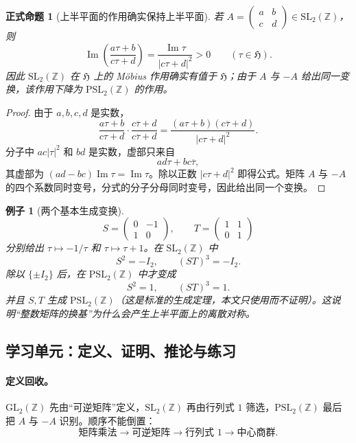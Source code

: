 \documentclass[UTF8,fontset=none,a4paper,11pt]{ctexart}
\theoremstyle{foundation-definition}
\theoremstyle{foundation-theorem}
\theoremstyle{foundation-proposition}
\newtheorem{proposition}[definition]{正式命题}
\theoremstyle{foundation-example}
\newtheorem{example}[definition]{例子}
\theoremstyle{foundation-remark}
\theoremstyle{foundation-theorem}
\begin{document}
\clearpage
\begin{proposition}[上半平面的作用确实保持上半平面]\label{prop:psl-action}
若 \(A=\begin{pmatrix}a&b\\c&d\end{pmatrix}\in\mathrm{SL}_2(\mathbb Z)\)，则
\[
\operatorname{Im}\left(\frac{a\tau+b}{c\tau+d}\right)
=\frac{\operatorname{Im}\tau}{|c\tau+d|^2}>0
\qquad(\tau\in\mathfrak H).
\]
因此 \(\mathrm{SL}_2(\mathbb Z)\) 在 \(\mathfrak H\) 上的 Möbius 作用确实有值于 \(\mathfrak H\)；由于 \(A\) 与 \(-A\) 给出同一变换，该作用下降为 \(\mathrm{PSL}_2(\mathbb Z)\) 的作用。
\end{proposition}

\begin{proof}
由于 \(a,b,c,d\) 是实数，
\[
\frac{a\tau+b}{c\tau+d}
\cdot\frac{c\overline\tau+d}{c\overline\tau+d}
=\frac{(a\tau+b)(c\overline\tau+d)}{|c\tau+d|^2}.
\]
分子中 \(ac|\tau|^2\) 和 \(bd\) 是实数，虚部只来自
\[
ad\tau+bc\overline\tau,
\]
其虚部为 \((ad-bc)\operatorname{Im}\tau=\operatorname{Im}\tau\)。除以正数 \(|c\tau+d|^2\) 即得公式。矩阵 \(A\) 与 \(-A\) 的四个系数同时变号，分式的分子分母同时变号，因此给出同一个变换。
\end{proof}

\begin{example}[两个基本生成变换]
\[
S=\begin{pmatrix}0&-1\\1&0\end{pmatrix},
\qquad
T=\begin{pmatrix}1&1\\0&1\end{pmatrix}
\]
分别给出 \(\tau\mapsto-1/\tau\) 和 \(\tau\mapsto\tau+1\)。在
\(\mathrm{SL}_2(\mathbb Z)\) 中
\[
S^2=-I_2,\qquad (ST)^3=-I_2.
\]
除以 \(\{\pm I_2\}\) 后，在 \(\mathrm{PSL}_2(\mathbb Z)\) 中才变成
\[
S^2=1,\qquad (ST)^3=1.
\]
并且 \(S,T\) 生成 \(\mathrm{PSL}_2(\mathbb Z)\)（这是标准的生成定理，本文只使用而不证明）。这说明“整数矩阵的换基”为什么会产生上半平面上的离散对称。
\end{example}

\subsection{学习单元：定义、证明、推论与练习}

\paragraph{定义回收。}
\(\mathrm{GL}_2(\mathbb Z)\) 先由“可逆矩阵”定义，\(\mathrm{SL}_2(\mathbb Z)\) 再由行列式 \(1\) 筛选，\(\mathrm{PSL}_2(\mathbb Z)\) 最后把 \(A\) 与 \(-A\) 识别。顺序不能倒置：
\[
\text{矩阵乘法}
\longrightarrow
\text{可逆矩阵}
\longrightarrow
\text{行列式 }1
\longrightarrow
\text{中心商群}.
\]
\end{document}
